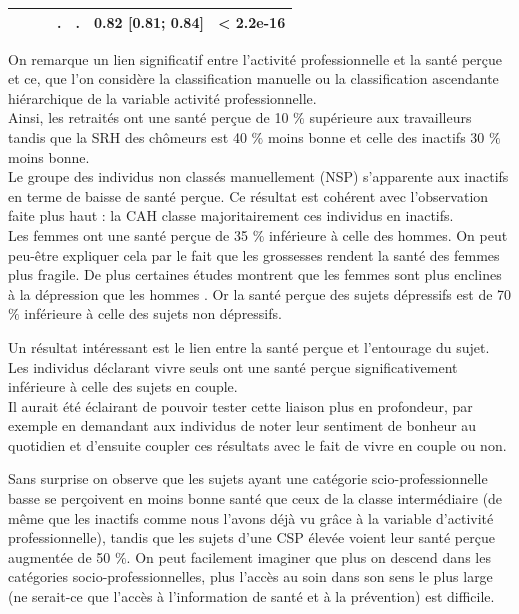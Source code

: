 \documentclass{book}
\begin{document}
\begin{longtable}{lcccc}
 $\qquad$ & .  & .  &0.82 [0.81;  0.84] &  < 2.2e-16 \\ 
    \hline
    \end{longtable} 

\bigskip

\noindent
On remarque un lien significatif entre l'activité professionnelle et la santé perçue et ce, que l'on considère la classification manuelle ou la classification ascendante hiérarchique de la variable activité professionnelle.\\
Ainsi, les retraités ont une santé perçue de 10 $\%$ supérieure aux travailleurs tandis que la SRH des chômeurs est 40 $\%$ moins bonne et celle des inactifs 30 $\%$ moins bonne. \\

\bigskip
\noindent
Le groupe des individus non classés manuellement (NSP) s'apparente aux inactifs en terme de baisse de santé perçue. Ce résultat est cohérent avec l'observation faite plus haut : la CAH classe majoritairement ces individus en inactifs.\\
\bigskip
\noindent
Les femmes ont une santé perçue de 35 $\%$ inférieure à celle des hommes. On peut peu-être expliquer cela par le fait que les grossesses rendent la santé des femmes plus fragile. De plus certaines études montrent que les femmes sont plus enclines à la dépression que les hommes \cite{nolen2001gender}. Or la santé perçue des sujets dépressifs est de 70 $\%$ inférieure à celle des sujets non dépressifs.\\
\bigskip

\noindent
Un résultat intéressant est le lien entre la santé perçue et l'entourage du sujet. Les individus déclarant vivre seuls ont une santé perçue significativement inférieure à celle des sujets en couple.\\ Il aurait été éclairant de pouvoir tester cette liaison plus en profondeur, par exemple en demandant aux individus de noter leur sentiment de bonheur au quotidien et d'ensuite coupler ces résultats avec le fait de vivre en couple ou non.\\
\bigskip

\noindent
Sans surprise on observe que les sujets ayant une catégorie scio-professionnelle basse se perçoivent en moins bonne santé que ceux de la classe intermédiaire (de même que les inactifs comme nous l'avons déjà vu grâce à la variable d'activité professionnelle), tandis que les sujets d'une CSP élevée voient leur santé perçue augmentée de 50 $\%$. On peut facilement imaginer que plus on descend dans les catégories socio-professionnelles, plus l'accès au soin dans son sens le plus large (ne serait-ce que l'accès à l'information de santé et à la prévention) est difficile.\\
\bigskip
\end{document}
